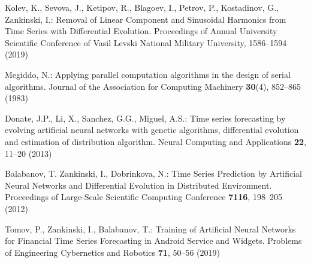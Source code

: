 \documentclass[runningheads]{llncs}
\begin{document}
\begin{thebibliography}{8}
 Kolev, K., Sevova, J., Ketipov, R., Blagoev, I., Petrov, P., Kostadinov, G., Zankinski, I.: Removal of Linear Component and Sinusoidal Harmonics from Time Series with Differential Evolution. Proceedings of Annual University Scientific Conference of Vasil Levski National Military University, 1586--1594 (2019)

 Megiddo, N.: Applying parallel computation algorithms in the design of serial algorithms. Journal of the Association for Computing Machinery \textbf{30}(4), 852--865 (1983)

 Donate, J.P., Li, X., Sanchez, G.G., Miguel, A.S.: Time series forecasting by evolving artificial neural networks with genetic algorithms, differential evolution and estimation of distribution algorithm. Neural Computing and Applications \textbf{22}, 11--20 (2013)

 Balabanov, T. Zankinski, I., Dobrinkova, N.: Time Series Prediction by Artificial Neural Networks and Differential Evolution in Distributed Environment. Proceedings of Large-Scale Scientific Computing Conference \textbf{7116}, 198--205 (2012)

  Tomov, P., Zankinski, I., Balabanov, T.: Training of Artificial Neural Networks for Financial Time Series Forecasting in Android Service and Widgets. Problems of Engineering Cybernetics and Robotics \textbf{71}, 50--56 (2019)

\end{thebibliography}
\end{document}
